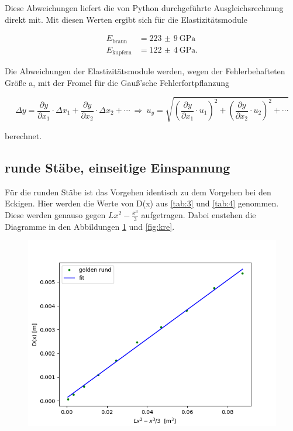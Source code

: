 \noindent Diese Abweichungen liefert die von Python durchgeführte Ausgleichsrechnung direkt mit. Mit diesen Werten ergibt sich für die Elastizitätsmodule

\begin{align*}
    E_\text{braun} &=   \SI[separate-uncertainty=true]{223(9)}{\giga\pascal}  \\
    E_\text{kupfern} &= \SI[separate-uncertainty=true]{122(4)}{\giga\pascal}.
\end{align*}

Die Abweichungen der Elastizitätsmodule werden, wegen der Fehlerbehafteten Größe a, mit der Fromel für die Gauß'sche Fehlerfortpflanzung 

\begin{equation} \label{Gauß}
    \Delta y = \frac{\partial y}{\partial x_1} \cdot \Delta x_1 + \frac{\partial y}{\partial x_2} \cdot \Delta x_2 +\cdots \ \Rightarrow \ {u_y}=\sqrt{\left (\frac{\partial y}{\partial x_1} \cdot u_1 \right)^2 +\left (\frac{\partial y}{\partial x_2} \cdot u_2 \right)^2 +\cdots}
\end{equation}

\noindent berechnet.

\subsection{runde Stäbe, einseitige Einspannung}

Für die runden Stäbe ist das Vorgehen identisch zu dem Vorgehen bei den Eckigen. Hier werden die Werte von D(x) aus \ref{tab:3} und \ref{tab:4} genommen. Diese werden genauso gegen $Lx^2-\frac{x^3}{3}$ aufgetragen. Dabei enstehen die Diagramme in den Abbildungen \ref{fig:gre} und \ref{fig:kre}.

\begin{figure}
    \centering
    \includegraphics{gre.png}
    \label{fig:gre}
\end{figure}

